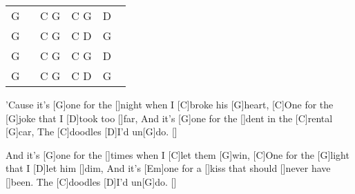 \begin{guitar}
	
	{\footnotesize\begin{tabular}{|l|l|l|l|}
			G ~ & C G & C G & D ~ \\
			G & C G & C D & G \\
			G & C G & C G & D \\
			G & C G & C D & G 
	\end{tabular}}
	
	'Cause it's [G]one for the []night when I [C]broke his [G]heart,
	[C]One for the [G]joke that I [D]took too []far,
	And it's [G]one for the []dent in the [C]rental [G]car,
	The [C]doodles [D]I'd un[G]do. []{}
	
	And it's [G]one for the []times when I [C]let them [G]win,
	[C]One for the [G]light that I [D]let him []dim,
	And it's [Em]one for a []kiss that should []never have []been. 
	The [C]doodles [D]I'd un[G]do. []{}
\end{guitar}